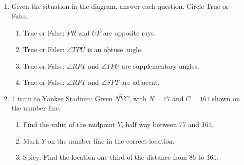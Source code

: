 \documentclass[12pt, oneside]{article}
\begin{document}
\begin{enumerate}
\newpage
  \item Given the situation in the diagram, answer each question. Circle True or False. \vspace{1cm}
      \begin{flushright}
      \end{flushright}
    \begin{enumerate}
      \item True or False: $\overrightarrow{PR}$ and $\overrightarrow{UP}$ are opposite rays.\bigskip
      \item True or False: $\angle TPU$ is an obtuse angle.\bigskip
      \item True or False: $\angle RPT$ and $\angle TPU$ are supplementary angles.\bigskip
      \item True or False: $\angle RPT$ and $\angle SPT$ are adjacent. \bigskip
    \end{enumerate}


    \item 4 train to Yankee Stadium: Given $\overleftrightarrow{NYC}$, with $N=77$ and $C=161$ shown on the number line. %
      \begin{center}
      \end{center}
      \begin{enumerate}
        \item Find the value of the midpoint $Y$, half way between 77 and 161. \vspace{4cm}
        \item Mark $Y$ on the number line in the correct location.
        \item Spicy: Find the location one-third of the distance from 86 to 161.
      \end{enumerate}


\end{enumerate}
\end{document}

